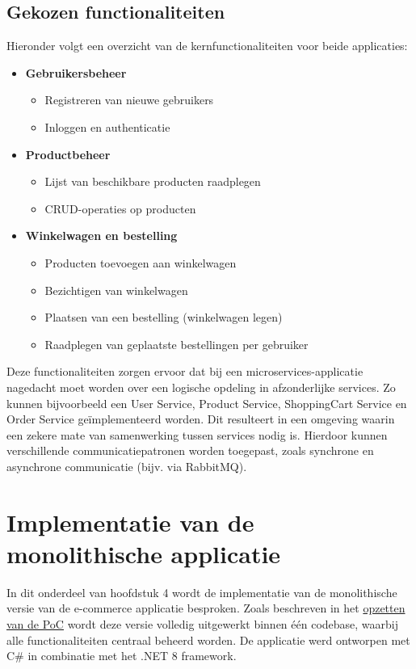 \subsection{Gekozen functionaliteiten}

Hieronder volgt een overzicht van de kernfunctionaliteiten voor beide applicaties:

\begin{itemize}
	\item \textbf{Gebruikersbeheer}
	\begin{itemize}
		\item Registreren van nieuwe gebruikers
		\item Inloggen en authenticatie
	\end{itemize}
	\item \textbf{Productbeheer}
	\begin{itemize}
		\item Lijst van beschikbare producten raadplegen
		\item CRUD-operaties op producten
	\end{itemize}
	\item \textbf{Winkelwagen en bestelling}
	\begin{itemize}
		\item Producten toevoegen aan winkelwagen
		\item Bezichtigen van winkelwagen
		\item Plaatsen van een bestelling (winkelwagen legen)
		\item Raadplegen van geplaatste bestellingen per gebruiker
	\end{itemize}
\end{itemize}

Deze functionaliteiten zorgen ervoor dat bij een microservices-applicatie nagedacht moet worden over een logische opdeling in afzonderlijke services. Zo kunnen bijvoorbeeld een User Service, Product Service, ShoppingCart Service en Order Service geïmplementeerd worden. Dit resulteert in een omgeving waarin een zekere mate van samenwerking tussen services nodig is. Hierdoor kunnen verschillende communicatiepatronen worden toegepast, zoals synchrone en asynchrone communicatie (bijv. via RabbitMQ).

\section{Implementatie van de monolithische applicatie}

In dit onderdeel van hoofdstuk 4 wordt de implementatie van de monolithische versie van de e-commerce applicatie besproken. Zoals beschreven in het \hyperref[opzetten_poc]{opzetten van de PoC} wordt deze versie volledig uitgewerkt binnen één codebase, waarbij alle functionaliteiten centraal beheerd worden. De applicatie werd ontworpen met C\# in combinatie met het .NET 8 framework.

